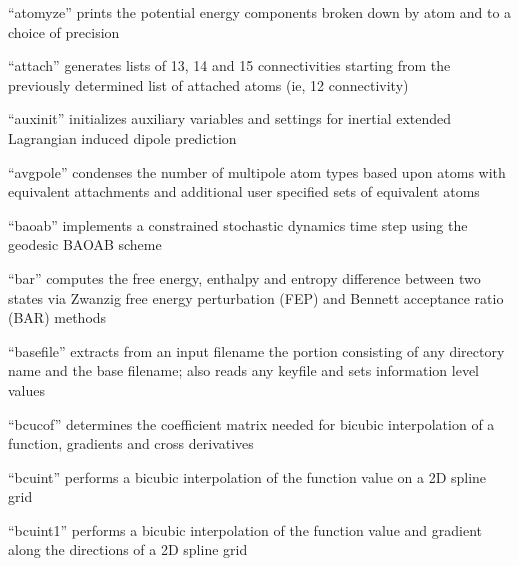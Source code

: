 \documentclass[letterpaper,11pt,english]{sphinxmanual}
\begin{document}

“atomyze” prints the potential energy components broken
down by atom and to a choice of precision


“attach” generates lists of 1\sphinxhyphen{}3, 1\sphinxhyphen{}4 and 1\sphinxhyphen{}5 connectivities
starting from the previously determined list of attached
atoms (ie, 1\sphinxhyphen{}2 connectivity)


“auxinit” initializes auxiliary variables and settings for
inertial extended Lagrangian induced dipole prediction


“avgpole” condenses the number of multipole atom types based
upon atoms with equivalent attachments and additional user
specified sets of equivalent atoms


“baoab” implements a constrained stochastic dynamics time
step using the geodesic BAOAB scheme


“bar” computes the free energy, enthalpy and entropy difference
between two states via Zwanzig free energy perturbation (FEP)
and Bennett acceptance ratio (BAR) methods



“basefile” extracts from an input filename the portion
consisting of any directory name and the base filename;
also reads any keyfile and sets information level values


“bcucof” determines the coefficient matrix needed for bicubic
interpolation of a function, gradients and cross derivatives


“bcuint” performs a bicubic interpolation of the function
value on a 2D spline grid


“bcuint1” performs a bicubic interpolation of the function
value and gradient along the directions of a 2D spline grid
\end{document}
